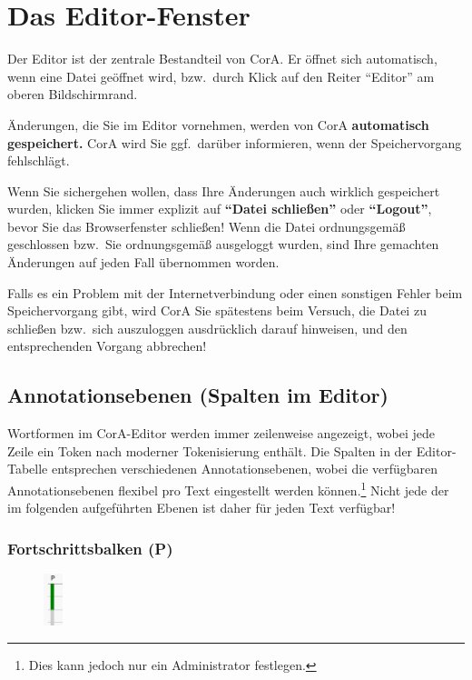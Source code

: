 \documentclass[11pt,a4paper,parskip=half]{scrartcl}
\begin{document}
\newpage
\section{Das Editor-Fenster}
\label{sec:editor}

Der Editor ist der zentrale Bestandteil von CorA.  Er öffnet sich
automatisch, wenn eine Datei geöffnet wird, bzw.\ durch Klick auf den
Reiter "`Editor"' am oberen Bildschirmrand.

Änderungen, die Sie im Editor vornehmen, werden von CorA \textbf{automatisch
  gespeichert.}  CorA wird Sie ggf.\ darüber informieren, wenn der
Speichervorgang fehlschlägt.

\begin{infobox}{}
  Wenn Sie sichergehen wollen, dass Ihre Änderungen auch wirklich gespeichert
  wurden, klicken Sie immer explizit auf \textbf{``Datei schließen''} oder
  \textbf{``Logout''}, bevor Sie das Browserfenster schließen!  Wenn die Datei
  ordnungsgemäß geschlossen bzw.\ Sie ordnungsgemäß ausgeloggt wurden, sind Ihre
  gemachten Änderungen auf jeden Fall übernommen worden.

  Falls es ein Problem mit der Internetverbindung oder einen sonstigen Fehler
  beim Speichervorgang gibt, wird CorA Sie spätestens beim Versuch, die Datei zu
  schließen bzw.\ sich auszuloggen ausdrücklich darauf hinweisen, und den
  entsprechenden Vorgang abbrechen!
\end{infobox}

\subsection{Annotationsebenen (Spalten im Editor)}

Wortformen im CorA-Editor werden immer zeilenweise angezeigt, wobei jede Zeile
ein Token nach moderner Tokenisierung enthält.  Die Spalten in der
Editor-Tabelle entsprechen verschiedenen Annotationsebenen, wobei die
verfügbaren Annotationsebenen flexibel pro Text eingestellt werden
können.\footnote{Dies kann jedoch nur ein Administrator festlegen.}  Nicht jede
der im folgenden aufgeführten Ebenen ist daher für jeden Text verfügbar!

\subsubsection{Fortschrittsbalken (P)}

\begin{figure}
  \begin{center}\vspace{-2em}
    \includegraphics[width=0.05\textwidth]{img/progress.png}
  \end{center}
\end{figure}
\end{document}
